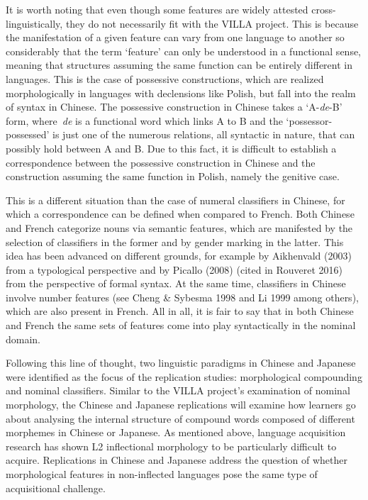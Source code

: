 \documentclass[12pt]{article}
\newcommand\textstyleAucun[1]{#1}
\newenvironment{styleStandard}{\setlength\leftskip{0cm}\setlength\rightskip{0cm plus 1fil}\setlength\parindent{0cm}\setlength\parfillskip{0pt plus 1fil}\setlength\parskip{0cm plus 1pt}\writerlistparindent\writerlistleftskip\leavevmode\normalfont\normalsize\writerlistlabel\ignorespaces}{\unskip\vspace{0cm plus 1pt}\par}
\newenvironment{styleCorps}{\setlength\leftskip{0cm}\setlength\rightskip{0cm plus 1fil}\setlength\parindent{0cm}\setlength\parfillskip{0pt plus 1fil}\setlength\parskip{0cm plus 1pt}\writerlistparindent\writerlistleftskip\leavevmode\normalfont\normalsize\fontsize{11pt}{13.2pt}\selectfont\writerlistlabel\ignorespaces}{\unskip\vspace{0cm plus 1pt}\par}
\newenvironment{styleCorpsAA}{\setlength\leftskip{0cm}\setlength\rightskip{0cm plus 1fil}\setlength\parindent{0cm}\setlength\parfillskip{0pt plus 1fil}\setlength\parskip{0cm plus 1pt}\writerlistparindent\writerlistleftskip\leavevmode\normalfont\normalsize\fontsize{11pt}{13.2pt}\selectfont\writerlistlabel\ignorespaces}{\unskip\vspace{0cm plus 1pt}\par}
\newcommand\writerlistleftskip{}
\newcommand\writerlistparindent{}
\newcommand\writerlistlabel{}
\begin{document}
\begin{styleCorps}
It is worth noting that even though some features are widely attested cross-linguistically, they do not necessarily fit with the VILLA project. This is because the manifestation of a given feature can vary from one language to another so considerably that the term ‘feature’ can only be understood in a functional sense, meaning that structures assuming the same function can be entirely different in languages. This is the case of possessive constructions, which are realized morphologically in languages with declensions like Polish, but fall into the realm of syntax in Chinese. The possessive construction in Chinese takes a ‘A-\textit{de}{}-B’ form, where~\textit{de} is a functional word which links A to B and the ‘possessor-possessed’ is just one of the numerous relations, all syntactic in nature, that can possibly hold between A and B. Due to this fact, it is difficult to establish a correspondence between the possessive construction in Chinese and the construction assuming the same function in Polish, namely the genitive case.
\end{styleCorps}

\begin{styleCorpsAA}
\textstyleAucun{This is a different situation than the case of numeral classifiers in Chinese, for which a correspondence can be defined when compared to French. Both Chinese and French categorize nouns via semantic features, which are manifested by the selection of classifiers in the former and by gender marking in the latter. This idea has been advanced on different grounds, for example by Aikhenvald (2003) from a typological perspective and by Picallo (2008) (cited in Rouveret 2016) from the perspective of formal syntax. At the same time, classifiers in Chinese involve number features (see Cheng \& Sybesma 1998 and Li 1999 among others), which are also present in French. All in all, it is fair to say that in both Chinese and French the same sets of features come into play syntactically in the nominal domain.~}
\end{styleCorpsAA}

\begin{styleStandard}
Following this line of thought, two linguistic paradigms in Chinese and Japanese were identified as the focus of the replication studies: morphological compounding and nominal classifiers. Similar to the VILLA project’s examination of nominal morphology, the Chinese and Japanese replications will examine how learners go about analysing the internal structure of compound words composed of different morphemes in Chinese or Japanese. As mentioned above, language acquisition research has shown L2 inflectional morphology to be particularly difficult to acquire. Replications in Chinese and Japanese address the question of whether morphological features in non-inflected languages pose the same type of acquisitional challenge.
\end{styleStandard}
\end{document}
